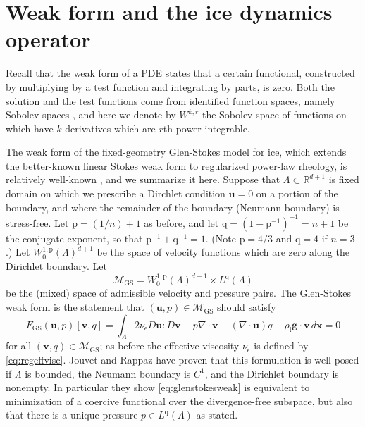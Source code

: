\documentclass[letterpaper,final,12pt,reqno]{amsart}
\theoremstyle{claim}
\newcommand{\eps}{\epsilon}
\newcommand{\RR}{\mathbb{R}}
\newcommand{\Div}{\nabla\cdot}
\newcommand{\bg}{\mathbf{g}}
\newcommand{\bu}{\mathbf{u}}
\newcommand{\bv}{\mathbf{v}}
\newcommand{\bx}{\mathbf{x}}
\newcommand{\rhoi}{\rho_{\text{i}}}
\newcommand{\pp}{{\text{p}}}
\newcommand{\qq}{{\text{q}}}
\numberwithin{equation}{section}
\numberwithin{figure}{section}
\numberwithin{table}{section}
\numberwithin{theorem}{section}
\begin{document}
\section{Weak form and the ice dynamics operator} \label{sec:weakido}

Recall that the weak form of a PDE states that a certain functional, constructed by multiplying by a test function and integrating by parts, is zero.  Both the solution and the test functions come from identified function spaces, namely Sobolev spaces \cite{Evans2010}, and here we denote by $W^{k,r}$ the Sobolev space of functions on which have $k$ derivatives which are $r$th-power integrable.

The weak form of the fixed-geometry Glen-Stokes model for ice, which extends the better-known linear Stokes weak form \cite{Elmanetal2014} to regularized power-law rheology, is relatively well-known \cite{IsaacStadlerGhattas2015,JouvetRappaz2011,Lengetal2012}, and we summarize it here.  Suppose that $\Lambda \subset \RR^{d+1}$ is fixed domain on which we prescribe a Dirchlet condition $\bu=0$ on a portion of the boundary, and where the remainder of the boundary (Neumann boundary) is stress-free.  Let $\pp=(1/n)+1$ as before, and let $\qq=(1-\pp^{-1})^{-1}=n+1$ be the conjugate exponent, so that $\pp^{-1}+\qq^{-1}=1$. (Note $\pp=4/3$ and $\qq = 4$ if $n=3$.)  Let $W_0^{1,\pp}(\Lambda)^{d+1}$ be the space of velocity functions which are zero along the Dirichlet boundary.  Let
\begin{equation}
\mathcal{M}_{\text{GS}} = W_0^{1,\pp}(\Lambda)^{d+1} \times L^\qq(\Lambda)  \label{eq:mixed}
\end{equation}
be the (mixed) space of admissible velocity and pressure pairs.  The Glen-Stokes weak form is the statement that $(\bu,p) \in \mathcal{M}_{\text{GS}}$ should satisfy
\begin{equation}
F_{\text{GS}}(\bu,p)[\bv,q] = \int_\Lambda 2 \nu_\eps D\bu : D\bv - p \Div\bv - (\Div\bu) q - \rhoi \bg \cdot \bv\,d\bx = 0 \label{eq:glenstokesweak}
\end{equation}
for all $(\bv,q) \in \mathcal{M}_{\text{GS}}$; as before the effective viscosity $\nu_\eps$ is defined by \eqref{eq:regeffvisc}.  Jouvet and Rappaz \cite{JouvetRappaz2011} have proven that this formulation is well-posed if $\Lambda$ is bounded, the Neumann boundary is $C^1$, and the Dirichlet boundary is nonempty.  In particular they show \eqref{eq:glenstokesweak} is equivalent to minimization of a coercive functional over the divergence-free subspace, but also that there is a unique pressure $p\in L^\qq(\Lambda)$ as stated.
\end{document}

